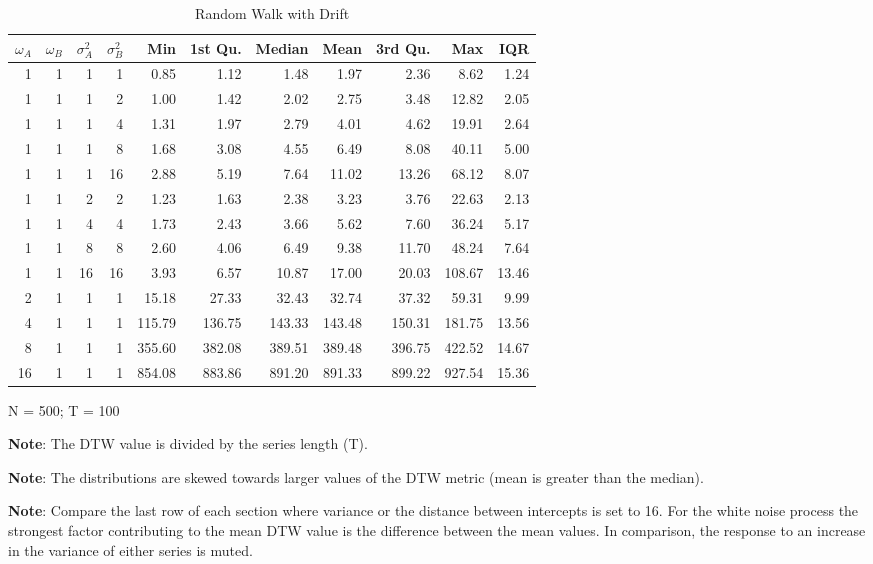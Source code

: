 \documentclass[12pt]{article}
\begin{document}
\begin{table}[!htb]
    \begin{center}
      \begin{tabular}{| r r r r | r r r r r r r |}
        \hline
        $\omega_{A}$ & $\omega_{B}$ & $\sigma^{2}_{A}$ & $\sigma^{2}_{B}$ & Min & 1st Qu. & Median & Mean & 3rd Qu. & Max & IQR \\
        \hline
        1  & 1 & 1  & 1  & 0.85   & 1.12   & 1.48   &  1.97  &  2.36  &  8.62  & 1.24  \\
        \hline
        1  & 1 & 1  & 2  & 1.00   & 1.42   & 2.02   &  2.75  &  3.48  & 12.82  & 2.05  \\
        1  & 1 & 1  & 4  & 1.31   & 1.97   & 2.79   &  4.01  &  4.62  & 19.91  & 2.64  \\
        1  & 1 & 1  & 8  & 1.68   & 3.08   & 4.55   &  6.49  &  8.08  & 40.11  & 5.00  \\
        1  & 1 & 1  & 16 & 2.88   & 5.19   & 7.64   & 11.02  & 13.26  & 68.12  & 8.07  \\
        \hline
        1  & 1 & 2  & 2  & 1.23   & 1.63   &  2.38  &  3.23  &  3.76  &  22.63 &  2.13  \\
        1  & 1 & 4  & 4  & 1.73   & 2.43   &  3.66  &  5.62  &  7.60  &  36.24 &  5.17  \\
        1  & 1 & 8  & 8  & 2.60   & 4.06   &  6.49  &  9.38  & 11.70  &  48.24 &  7.64  \\
        1  & 1 & 16 & 16 & 3.93   & 6.57   & 10.87  & 17.00  & 20.03  & 108.67 & 13.46  \\
        \hline
        2  & 1 & 1  & 1  &  15.18 &  27.33 &  32.43 &  32.74 &  37.32 &  59.31 &  9.99  \\
        4  & 1 & 1  & 1  & 115.79 & 136.75 & 143.33 & 143.48 & 150.31 & 181.75 & 13.56  \\
        8  & 1 & 1  & 1  & 355.60 & 382.08 & 389.51 & 389.48 & 396.75 & 422.52 & 14.67  \\
        16 & 1 & 1  & 1  & 854.08 & 883.86 & 891.20 & 891.33 & 899.22 & 927.54 & 15.36  \\
        \hline
      \end{tabular}
    \caption{Random Walk with Drift}
    \end{center}
    \begin{tablenotes}
        \item{\footnotesize N = 500; T = 100}
        \item {\footnotesize \textbf{Note}: The DTW value is divided by the series length (T).}
        \item {\footnotesize \textbf{Note}: The distributions are skewed towards larger values of the DTW metric (mean is greater than the median).}
        \item{\footnotesize \textbf{Note}: Compare the last row of each section where variance or the distance between intercepts is set to 16. For the white noise process the strongest factor contributing to the mean DTW value is the difference between the mean values. In comparison, the response to an increase in the variance of either series is muted.}
    \end{tablenotes}
\end{table}
\end{document}

